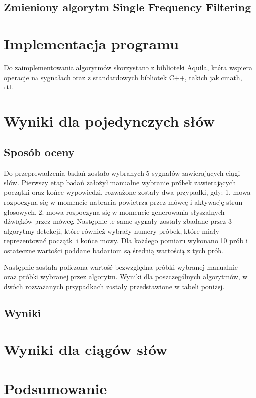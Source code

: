 \documentclass[eng,printmode]{mgr}
\begin{document}
 
\section{Zmieniony algorytm Single Frequency Filtering}
\chapter{Implementacja programu}
Do zaimplementowania algorytmów skorzystano z biblioteki Aquila, która wspiera operacje na sygnałach oraz z standardowych bibliotek C++, takich jak cmath, stl.



\chapter{Wyniki dla pojedynczych słów}
 \section{Sposób oceny}
	Do przeprowadzenia badań zostało wybranych 5 sygnałów zawierających ciągi słów. Pierwszy etap badań założył manualne wybranie próbek zawierających początki oraz końce wypowiedzi, rozważone zostały dwa przypadki, gdy: 
	1.  mowa rozpoczyna się w momencie nabrania powietrza przez mówcę i aktywację strun głosowych,
	2. 	mowa rozpoczyna się w momencie generowania słyszalnych dźwięków przez mówcę.
	Następnie te same sygnały zostały zbadane przez 3 algorytmy detekcji, które również wybrały numery próbek, które miały reprezentować początki i końce mowy. Dla każdego pomiaru wykonano 10 prób i ostateczne wartości poddane badaniom są średnią wartością z tych prób. 
	
	 Następnie została policzona wartość bezwzględna próbki wybranej manualnie oraz próbki wybranej przez algorytm. Wyniki dla poszczególnych algorytmów, w dwóch rozważanych przypadkach zostały przedstawione w tabeli poniżej.
 \section{Wyniki}

\chapter{Wyniki dla ciągów słów}

\chapter{Podsumowanie}

%


 \listoffigures
 \listoftables
\end{document}
